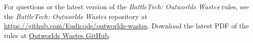 For questions or the latest version of the \emph{BattleTech: Outworlds Wastes} rules, see the \emph{BattleTech: Outworlds Wastes} repository at \href{https://github.com/Eudicods/outworlds-wastes}{https://github.com/Eudicods/outworlds-wastes}.
Download the latest PDF of the rules at \href{https://raw.githubusercontent.com/Eudicods/outworlds-wastes/main/league/outworlds-wastes-league.pdf}{Outworlds Wastes GitHub}.
